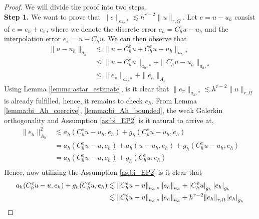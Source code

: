 \begin{proof}
    We will divide the proof into two steps.
    \\
        \textbf{Step 1.} We want to prove that $\| e \|_{ a_{h},* }^{  } \lesssim   h^{r-2} \| u \|_{ r,\Omega  }^{  }$.
    Let $e = u - u_{h}$ consist of $e = e_{h} + e_{\pi }$, where we denote the discrete error $e_{h} = C _{h}^{e} u - u_{h}$ and the interpolation error $e_{\pi } = u - C _{h} ^{e}u$. We can then observe that
    \[
        \begin{split}
    \| u - u_{h} \|_{ a_{h} }^{  } & \lesssim  \| u - C_{h}^{e} u + C_{h}^{e}u - u_{h} \|_{ a_{h},* }^{  } \\
    & \le \|  u - C_{h}^{e} u \|_{a_{h},*  }^{  } +  \| C_{h}^{e}u - u_{h} \|_{a_{h},*  }^{  }\\
                                     & \le \| e_{\pi } \|_{a_{h},*}^{  } + \| e_{h} \|_{A_{h}  }^{  }
        \end{split}
    \]
    Using Lemma \ref{lemma:astar_estimate}, is it clear that $\| e_{\pi } \|_{a_{h},*}^{  } \lesssim h^{r-2} \| u \|_{ r,\Omega  }^{  }  $ is already fulfilled, hence, it remains to check $e_{h}$. From Lemma \ref{lemma:bi_Ah_coercive},
    \ref{lemma:bi_Ah_bounded}, the weak Galerkin orthogonality and Assumption \ref{as:bi_EP2} is it natural to arrive at,
    \begin{equation}
        \label{eq:apriori_energy1}
    \begin{split}
\| e_{h} \|_{ A_{h} }^{ 2 } & \lesssim a_{h}( C _{h}^{e} u - u_{h}, e_{h}) + g_{h}( C _{h}^{e}u - u_{h}, e_{h}) \\
 & = a_{h}( C _{h}^{e} u - u, e_{h}) + a_{h}( u - u_{h}, e_{h}) + g_{h}( C _{h}^{e}u - u_{h}, e_{h}) \\
 & = a_{h}( C _{h}^{e} u - u, e_{h}) + g_{h}( C _{h}^{e}u, e_{h}) \\
    \end{split}
    \end{equation}
Hence, now utilizing the Assumption \ref{as:bi_EP2} is it clear that
\begin{equation}
        \label{eq:apriori_energy2}
    \begin{split}
        a_{h}( C _{h}^{e} u - u, e_{h}) + g_{h}( C _{h}^{e}u, e_{h}) &\lesssim \| C _{h}^{e} u - u \|_{a_{h},*  }^{  } \| e_{h} \|_{a_{h}  }^{  }
        + \abs{ C _{h}^{e}u }_{g_{h}} \abs{e_{h}  }_{g_{h}} \\
         &\lesssim \| C _{h}^{e} u - u \|_{a_{h},*  }^{  } \| e_{h} \|_{a_{h}  }^{  } + h^{r-2} \| e_{h} \|_{r, \Omega   }^{  }\abs{e_{h}  }_{g_{h}} \\

\end{split}
\end{equation}
\end{proof}
